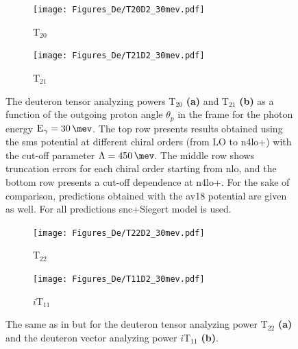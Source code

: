     \begin{figure}[htb]
        \centering
        \begin{subfigure}[b]{0.46\textwidth}
            \caption{T$_{20}$}
            \texttt{[image: Figures\_De/T20D2\_30mev.pdf]}
            \label{T20_30_vert}
        \end{subfigure}
        \begin{subfigure}[b]{0.46\textwidth}
            \caption{T$_{21}$}
            \texttt{[image: Figures\_De/T21D2\_30mev.pdf]}
            \label{T21_30_vert}
        \end{subfigure}
        \caption{The deuteron tensor analyzing powers T$_{20}$  {\bf (a)}
        and T$_{21}$ {\bf (b)}
        as a function of the outgoing proton angle $\theta_p$ in the  frame 
        for the photon energy $\text{E}_\gamma = \SI{30}{\mev}$.
        The top row presents results obtained using the \gls{sms} potential
        at different chiral orders (from LO to \gls{n4lo+}) with the cut-off parameter $\Lambda=\SI{450}{\mev}$.
        The middle row shows truncation errors for each 
        chiral order starting from \gls{nlo}, and
        the bottom row presents a cut-off dependence at \gls{n4lo+}.
        For the sake of comparison, predictions obtained with the \gls{av18} potential are given as well.
        For all predictions \gls{snc}+Siegert model is used.}
        \label{T20_T21_30}
    \end{figure}

    \begin{figure}[htb]
        \centering
        \begin{subfigure}[b]{0.46\textwidth}
            \caption{T$_{22}$}
            \texttt{[image: Figures\_De/T22D2\_30mev.pdf]}
            \label{T22_30_vert}
        \end{subfigure}
        \begin{subfigure}[b]{0.46\textwidth}
            \caption{$i\text{T}_{11}$}
            \texttt{[image: Figures\_De/T11D2\_30mev.pdf]}
            \label{T11_30_vert}
        \end{subfigure}
        \caption{The same as in  but for the deuteron tensor analyzing power
        T$_{22}$ {\bf (a)} and the deuteron vector analyzing power
        $i\text{T}_{11}$ {\bf (b)}.}
        \label{T22_T11_30}
    \end{figure}

